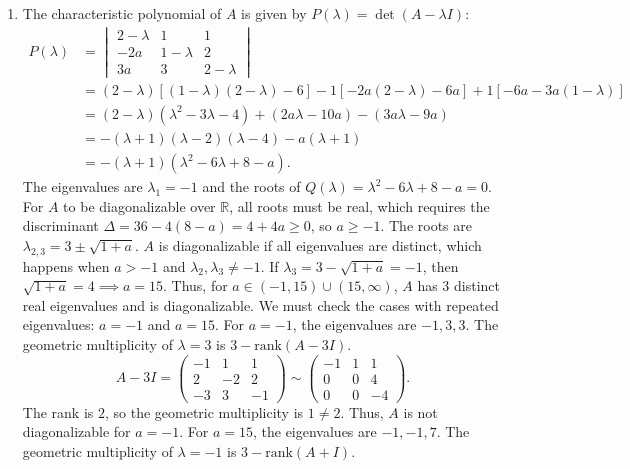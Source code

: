 \documentclass{article}
\begin{document}
\begin{enumerate}[label=\fbox{\arabic*}]
  \item %
        The characteristic polynomial of $A$ is given by $P(\lambda) = \det(A - \lambda I)$:
        \begin{align*}
          P(\lambda) &= \begin{vmatrix} 2-\lambda & 1 & 1 \\ -2a & 1-\lambda & 2 \\ 3a & 3 & 2-\lambda \end{vmatrix} \\
                     &= (2-\lambda)[(1-\lambda)(2-\lambda) - 6] - 1[-2a(2-\lambda) - 6a] + 1[-6a - 3a(1-\lambda)] \\
                     &= (2-\lambda)(\lambda^2 - 3\lambda - 4) + (2a\lambda - 10a) - (3a\lambda - 9a) \\
                     &= -(\lambda+1)(\lambda-2)(\lambda-4) - a(\lambda+1) \\
                     &= -(\lambda+1)(\lambda^2 - 6\lambda + 8 - a).
        \end{align*}
        The eigenvalues are $\lambda_1 = -1$ and the roots of $Q(\lambda) = \lambda^2 - 6\lambda + 8 - a = 0$.
        For $A$ to be diagonalizable over $\mathbb{R}$, all roots must be real, which requires the discriminant $\Delta = 36 - 4(8-a) = 4 + 4a \ge 0$, so $a \ge -1$.
        The roots are $\lambda_{2,3} = 3 \pm \sqrt{1+a}$. $A$ is diagonalizable if all eigenvalues are distinct, which happens when $a > -1$ and $\lambda_2, \lambda_3 \neq -1$.
        If $\lambda_3 = 3 - \sqrt{1+a} = -1$, then $\sqrt{1+a} = 4 \implies a = 15$. Thus, for $a \in (-1, 15) \cup (15, \infty)$, $A$ has 3 distinct real eigenvalues and is diagonalizable.
        We must check the cases with repeated eigenvalues: $a = -1$ and $a = 15$.
        For $a = -1$, the eigenvalues are $-1, 3, 3$. The geometric multiplicity of $\lambda = 3$ is $3 - \text{rank}(A - 3I)$.
        \[
          A - 3I = \begin{pmatrix} -1 & 1 & 1 \\ 2 & -2 & 2 \\ -3 & 3 & -1 \end{pmatrix} \sim \begin{pmatrix} -1 & 1 & 1 \\ 0 & 0 & 4 \\ 0 & 0 & -4 \end{pmatrix}.
        \]
        The rank is $2$, so the geometric multiplicity is $1 \neq 2$. Thus, $A$ is not diagonalizable for $a = -1$.
        For $a = 15$, the eigenvalues are $-1, -1, 7$. The geometric multiplicity of $\lambda = -1$ is $3 - \text{rank}(A + I)$.

\end{enumerate}
\end{document}
